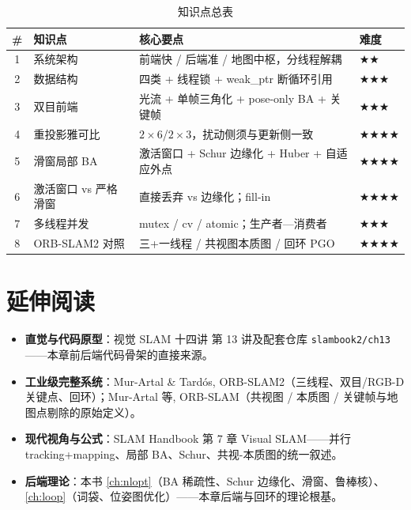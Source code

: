 \begin{table}[H]\centering\small
\caption{知识点总表}
\begin{tabular}{clll}
\toprule
\# & 知识点 & 核心要点 & 难度 \\
\midrule
1 & 系统架构 & 前端快 / 后端准 / 地图中枢，分线程解耦 & $\bigstar\bigstar$ \\
2 & 数据结构 & 四类 + 线程锁 + weak\_ptr 断循环引用 & $\bigstar\bigstar\bigstar$ \\
3 & 双目前端 & 光流 + 单帧三角化 + pose-only BA + 关键帧 & $\bigstar\bigstar\bigstar$ \\
4 & 重投影雅可比 & $2\times6$/$2\times3$，扰动侧须与更新侧一致 & $\bigstar\bigstar\bigstar\bigstar$ \\
5 & 滑窗局部 BA & 激活窗口 + Schur 边缘化 + Huber + 自适应外点 & $\bigstar\bigstar\bigstar\bigstar$ \\
6 & 激活窗口 vs 严格滑窗 & 直接丢弃 vs 边缘化；fill-in & $\bigstar\bigstar\bigstar\bigstar$ \\
7 & 多线程并发 & mutex / cv / atomic；生产者—消费者 & $\bigstar\bigstar\bigstar$ \\
8 & ORB-SLAM2 对照 & 三+一线程 / 共视图本质图 / 回环 PGO & $\bigstar\bigstar\bigstar\bigstar$ \\
\bottomrule
\end{tabular}
\end{table}

\section*{延伸阅读}
\begin{itemize}
  \item \textbf{直觉与代码原型}：视觉 SLAM 十四讲\cite{gaoxiang2019slam14} 第 13 讲及配套仓库 \texttt{slambook2/ch13}——本章前后端代码骨架的直接来源。
  \item \textbf{工业级完整系统}：Mur-Artal \& Tardós, ORB-SLAM2\cite{murartal2017orbslam2}（三线程、双目/RGB-D 关键点、回环）；Mur-Artal 等, ORB-SLAM\cite{murartal2015orbslam}（共视图 / 本质图 / 关键帧与地图点剔除的原始定义）。
  \item \textbf{现代视角与公式}：SLAM Handbook\cite{carlone2026handbook} 第 7 章 Visual SLAM——并行 tracking+mapping、局部 BA、Schur、共视-本质图的统一叙述。
  \item \textbf{后端理论}：本书 \cref{ch:nlopt}（BA 稀疏性、Schur 边缘化、滑窗、鲁棒核）、\cref{ch:loop}（词袋、位姿图优化）——本章后端与回环的理论根基。
\end{itemize}

